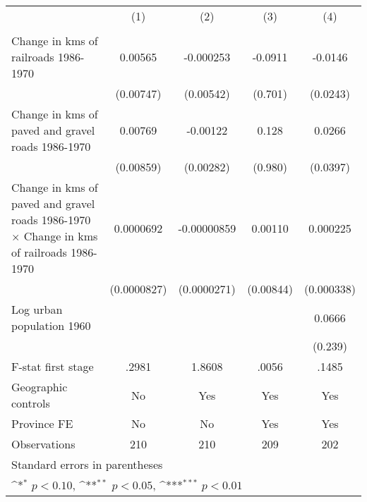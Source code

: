 {
\def\sym#1{\ifmmode^{#1}\else\(^{#1}\)\fi}
\begin{tabular}{l*{4}{c}}
\hline\hline
                &\multicolumn{1}{c}{(1)}&\multicolumn{1}{c}{(2)}&\multicolumn{1}{c}{(3)}&\multicolumn{1}{c}{(4)}\\
                &\multicolumn{1}{c}{}&\multicolumn{1}{c}{}&\multicolumn{1}{c}{}&\multicolumn{1}{c}{}\\
\hline
Change in kms of railroads 1986-1970&  0.00565         &-0.000253         &  -0.0911         &  -0.0146         \\
                &(0.00747)         &(0.00542)         &  (0.701)         & (0.0243)         \\
[1em]
Change in kms of paved and gravel roads 1986-1970&  0.00769         & -0.00122         &    0.128         &   0.0266         \\
                &(0.00859)         &(0.00282)         &  (0.980)         & (0.0397)         \\
[1em]
Change in kms of paved and gravel roads 1986-1970 $\times$ Change in kms of railroads 1986-1970&0.0000692         &-0.00000859         &  0.00110         & 0.000225         \\
                &(0.0000827)         &(0.0000271)         &(0.00844)         &(0.000338)         \\
[1em]
Log urban population 1960&                  &                  &                  &   0.0666         \\
                &                  &                  &                  &  (0.239)         \\
\hline
F-stat first stage&    .2981         &   1.8608         &    .0056         &    .1485         \\
Geographic controls&       No         &      Yes         &      Yes         &      Yes         \\
Province FE     &       No         &       No         &      Yes         &      Yes         \\
Observations    &      210         &      210         &      209         &      202         \\
\hline\hline
\multicolumn{5}{l}{\footnotesize Standard errors in parentheses}\\
\multicolumn{5}{l}{\footnotesize \sym{*} \(p<0.10\), \sym{**} \(p<0.05\), \sym{***} \(p<0.01\)}\\
\end{tabular}
}
